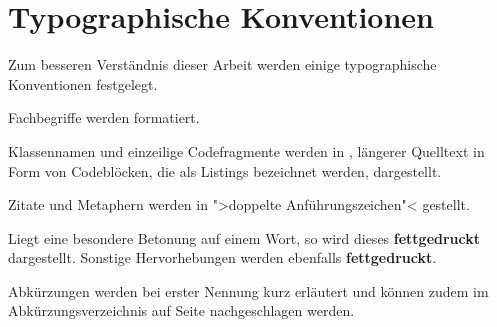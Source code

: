 \section{Typographische Konventionen}
\label{sec:Typographische_Konventionen}

Zum besseren Verständnis dieser Arbeit werden einige typographische Konventionen festgelegt.

Fachbegriffe werden  formatiert.

Klassennamen und einzeilige Codefragmente werden in , längerer Quelltext in Form von Codeblöcken, die als Listings bezeichnet werden, dargestellt.

Zitate und Metaphern werden in ">doppelte Anführungszeichen"< gestellt.

Liegt eine besondere Betonung auf einem Wort, so wird dieses \textbf{fettgedruckt} dargestellt.
Sonstige Hervorhebungen werden ebenfalls \textbf{fettgedruckt}.

Abkürzungen werden bei erster Nennung kurz erläutert und können zudem im Abkürzungsverzeichnis auf Seite \pageref{sec:Glossar} nachgeschlagen werden.